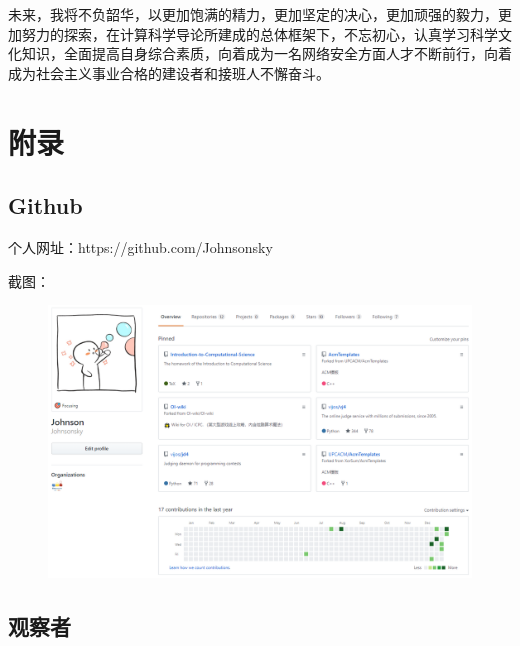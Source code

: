 \documentclass{article}
\begin{document}
未来，我将不负韶华，以更加饱满的精力，更加坚定的决心，更加顽强的毅力，更加努力的探索，在计算科学导论所建成的总体框架下，不忘初心，认真学习科学文化知识，全面提高自身综合素质，向着成为一名网络安全方面人才不断前行，向着成为社会主义事业合格的建设者和接班人不懈奋斗。

\section{附录}

\subsection{Github}

个人网址：https://github.com/Johnsonsky

截图：
\begin{figure}[H]
    \centering
    \includegraphics[scale=0.3]{F1}
    \label{fig:F1}
\end{figure}

\subsection{观察者}
\end{document}
